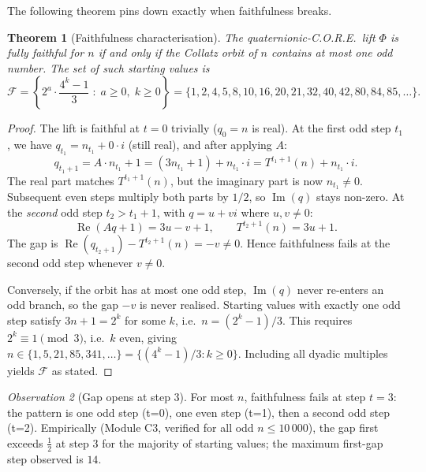 \documentclass[12pt,reqno]{amsart}
\theoremstyle{plain}
\newtheorem{theorem}{Theorem}[section]
\theoremstyle{definition}
\theoremstyle{remark}
\newtheorem{observation}[theorem]{Observation}
\begin{document}
The following theorem pins down exactly when faithfulness breaks.

\begin{theorem}[Faithfulness characterisation]
\label{thm:faithfulness}
The quaternionic-C.O.R.E.\ lift $\Phi$ is fully faithful for $n$ if and
only if the Collatz orbit of $n$ contains at most one odd number.
The set of such starting values is
\[
  \mathcal{F} = \left\{ 2^a \cdot \frac{4^k - 1}{3} \;:\;
  a \geq 0,\; k \geq 0 \right\}
  = \{1, 2, 4, 5, 8, 10, 16, 20, 21, 32, 40, 42, 80, 84, 85, \ldots\}.
\]
\end{theorem}

\begin{proof}
The lift is faithful at $t = 0$ trivially ($q_0 = n$ is real).
At the first odd step $t_1$, we have $q_{t_1} = n_{t_1} + 0 \cdot i$
(still real), and after applying $A$:
\[
  q_{t_1+1} = A \cdot n_{t_1} + 1 = (3n_{t_1}+1) + n_{t_1} \cdot i
            = T^{t_1+1}(n) + n_{t_1} \cdot i.
\]
The real part matches $T^{t_1+1}(n)$, but the imaginary part is now
$n_{t_1} \neq 0$.  Subsequent even steps multiply both parts by $1/2$,
so $\operatorname{Im}(q)$ stays non-zero.  At the \emph{second} odd step
$t_2 > t_1 + 1$, with $q = u + vi$ where $u,v \neq 0$:
\[
  \operatorname{Re}(Aq + 1) = 3u - v + 1,
  \qquad
  T^{t_2+1}(n) = 3u + 1.
\]
The gap is $\operatorname{Re}(q_{t_2+1}) - T^{t_2+1}(n) = -v \neq 0$.
Hence faithfulness fails at the second odd step whenever $v \neq 0$.

Conversely, if the orbit has at most one odd step, $\operatorname{Im}(q)$
never re-enters an odd branch, so the gap $-v$ is never realised.
Starting values with exactly one odd step satisfy $3n + 1 = 2^k$ for
some $k$, i.e.\ $n = (2^k - 1)/3$.  This requires $2^k \equiv 1 \pmod 3$,
i.e.\ $k$ even, giving $n \in \{1, 5, 21, 85, 341, \ldots\} = \{(4^k-1)/3 : k \geq 0\}$.
Including all dyadic multiples yields $\mathcal{F}$ as stated.
\end{proof}

\begin{observation}[Gap opens at step 3]
\label{obs:step3}
For most $n$, faithfulness fails at step $t = 3$: the pattern is one
odd step (t=0), one even step (t=1), then a second odd step (t=2).
Empirically (Module C3, verified for all odd $n \leq 10\,000$),
the gap first exceeds $\frac{1}{2}$ at step $3$ for the majority of
starting values; the maximum first-gap step observed is $14$.
\end{observation}

\end{document}

